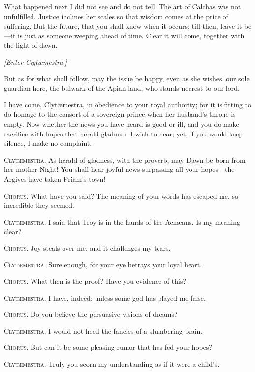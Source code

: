 \documentclass[12pt]{article}
\begin{document}
What happened next I did not see and do not tell. The art of Calchas was not unfulfilled. Justice inclines her scales so that wisdom comes at the price of suffering. But the future, that you shall know when it occurs; till then, leave it be---it is just as someone weeping ahead of time. Clear it will come, together with the light of dawn.

\begin{center}
\textit{[Enter Clyt{\ae}mestra.]}
\end{center}

\noindent But as for what shall follow, may the issue be happy, even as she wishes, our sole guardian here, the bulwark of the Apian land, who stands nearest to our lord.

I have come, Clyt{\ae}mestra, in obedience to your royal authority; for it is fitting to do homage to the consort of a sovereign prince when her husband's throne is empty. Now whether the news you have heard is good or ill, and you do make sacrifice with hopes that herald gladness, I wish to hear; yet, if you would keep silence, I make no complaint.

\textsc{Clyt{\ae}mestra.} As herald of gladness, with the proverb, may Dawn be born from her mother Night! You shall hear joyful news surpassing all your hopes---the Argives have taken Priam's town!

\textsc{Chorus.} What have you said? The meaning of your words has escaped me, so incredible they seemed.

\textsc{Clyt{\ae}mestra.} I said that Troy is in the hands of the Ach{\ae}ans. Is my meaning clear?

\textsc{Chorus.} Joy steals over me, and it challenges my tears.

\textsc{Clyt{\ae}mestra.} Sure enough, for your eye betrays your loyal heart.

\textsc{Chorus.} What then is the proof? Have you evidence of this?

\textsc{Clyt{\ae}mestra.} I have, indeed; unless some god has played me false.

\textsc{Chorus.} Do you believe the persuasive visions of dreams?

\textsc{Clyt{\ae}mestra.} I would not heed the fancies of a slumbering brain.

\textsc{Chorus.} But can it be some pleasing rumor that has fed your hopes?

\textsc{Clyt{\ae}mestra.} Truly you scorn my understanding as if it were a child's.
\end{document}
